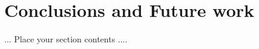 \def\baselinestretch{1}
\chapter{Conclusions and Future work}
\ifpdf
    \graphicspath{{Conclusions/ConclusionsFigs/PNG/}{Conclusions/ConclusionsFigs/PDF/}{Conclusions/ConclusionsFigs/}}
\else
    \graphicspath{{Conclusions/ConclusionsFigs/EPS/}{Conclusions/ConclusionsFigs/}}
\fi

\def\baselinestretch{1.66}

... Place your section contents ....



